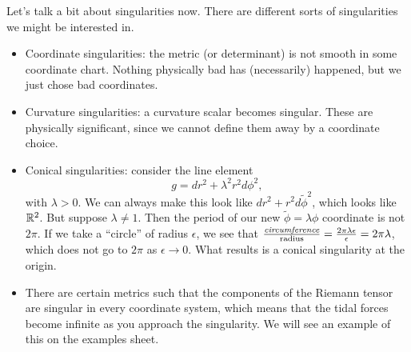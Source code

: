 Let's talk a bit about singularities now. There are different sorts of singularities we might be interested in.
\begin{itemize}
    \item Coordinate singularities: the metric (or determinant) is not smooth in some coordinate chart. Nothing physically bad has (necessarily) happened, but we just chose bad coordinates.
    \item Curvature singularities: a curvature scalar becomes singular. These are physically significant, since we cannot define them away by a coordinate choice.
    \item Conical singularities: consider the line element
    \begin{equation}
        g=dr^2 +\lambda^2 r^2 d\phi^2,
    \end{equation}
    with $\lambda>0$. We can always make this look like $dr^2+r^2 d\tilde \phi^2$, which looks like $\mathbb{R}^2$. But suppose $\lambda \neq 1$. Then the period of our new $\tilde \phi=\lambda \phi$ coordinate is not $2\pi$. If we take a ``circle'' of radius $\epsilon$, we see that $\frac{\emph{circumference}}{\text{radius}}=\frac{2\pi \lambda \epsilon}{\epsilon}=2\pi \lambda$, which does not go to $2\pi$ as $\epsilon\to 0$. What results is a conical singularity at the origin.
    \item There are certain metrics such that the components of the Riemann tensor are singular in every coordinate system, which means that the tidal forces become infinite as you approach the singularity. We will see an example of this on the examples sheet.
\end{itemize}


